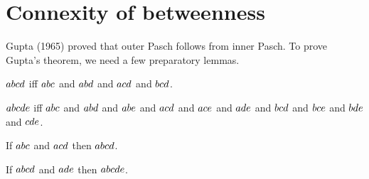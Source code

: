 \documentclass[10pt,a4paper,parskip=half,numbers=endperiod,parskip]{scrartcl}
\begin{document}
  \section{Connexity of betweenness}

  Gupta (1965) proved that outer Pasch follows from inner Pasch.
  To prove Gupta's theorem, we need a few preparatory lemmas.



  \begin{forthel}
    \begin{definition}
      $a b c d$ iff
      $a b c$ and
      $a b d$ and
      $a c d$ and
      $b c d$.
    \end{definition}

    \begin{definition}
      $a b c d e$ iff
      $a b c$ and
      $a b d$ and
      $a b e$ and
      $a c d$ and
      $a c e$ and
      $a d e$ and
      $b c d$ and
      $b c e$ and
      $b d e$ and
      $c d e$.
    \end{definition}

    \begin{lemma} %
      If $a b c$ and $a c d$
      then $a b c d$.
    \end{lemma}

    \begin{lemma} %
      If $a b c d$ and $a d e$
      then $a b c d e$.
    \end{lemma}
  \end{forthel}
\end{document}
